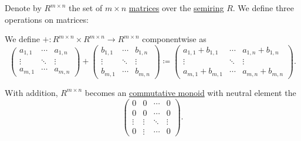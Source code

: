 \begin{proposition}\label{thm:matrix_algebra}
  Denote by \( R^{m \times n} \) the set of \( m \times n \) \hyperref[def:array/matrix]{matrices} over the \hyperref[def:semiring]{semiring} \( R \). We define three operations on matrices:
  \begin{thmenum}
     We define  \( +: R^{m \times n} \times R^{m \times n} \to R^{m \times n} \) componentwise as
    \begin{equation*}
      \begin{pmatrix}
        a_{1,1} & \cdots & a_{1,n} \\
        \vdots  & \ddots & \vdots  \\
        a_{m,1} & \cdots & a_{m,n}
      \end{pmatrix}
      +
      \begin{pmatrix}
        b_{1,1} & \cdots & b_{1,n} \\
        \vdots  & \ddots & \vdots  \\
        b_{m,1} & \cdots & b_{m,n}
      \end{pmatrix}
      \coloneqq
      \begin{pmatrix}
        a_{1,1} + b_{1,1} & \cdots & a_{1,n} + b_{1,n} \\
        \vdots            & \ddots & \vdots            \\
        a_{m,1} + b_{m,1} & \cdots & a_{m,n} + b_{m,n}
      \end{pmatrix}.
    \end{equation*}

    With addition, \( R^{m \times n} \) becomes an \hyperref[def:monoid/commutative]{commutative monoid} with neutral element the 
    \begin{equation}\label{eq:def:matrix_algebra/matrix_multiplication/zero}
      \begin{pmatrix}
        0       & 0      & \cdots & 0      \\
        0       & 0      & \cdots & 0      \\
        \vdots  & \vdots & \ddots & \vdots \\
        0       & \vdots & \cdots & 0
      \end{pmatrix}.
    \end{equation}


\end{thmenum}
\end{proposition}
